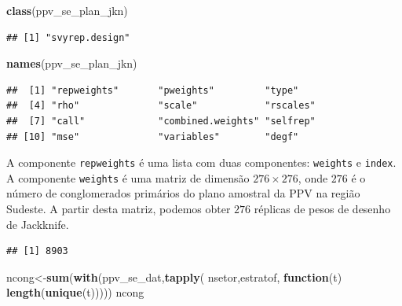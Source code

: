 \documentclass[]{book}
\newenvironment{Shaded}{\begin{snugshade}}{\end{snugshade}}
\newcommand{\KeywordTok}[1]{\textcolor[rgb]{0.13,0.29,0.53}{\textbf{#1}}}
\newcommand{\ControlFlowTok}[1]{\textcolor[rgb]{0.13,0.29,0.53}{\textbf{#1}}}
\newcommand{\OperatorTok}[1]{\textcolor[rgb]{0.81,0.36,0.00}{\textbf{#1}}}
\newcommand{\NormalTok}[1]{#1}
\theoremstyle{definition}
\theoremstyle{definition}
\theoremstyle{definition}
\theoremstyle{remark}
\begin{document}
\begin{Shaded}
\begin{Highlighting}[]
\KeywordTok{class}\NormalTok{(ppv_se_plan_jkn)}
\end{Highlighting}
\end{Shaded}

\begin{verbatim}
## [1] "svyrep.design"
\end{verbatim}

\begin{Shaded}
\begin{Highlighting}[]
\KeywordTok{names}\NormalTok{(ppv_se_plan_jkn)}
\end{Highlighting}
\end{Shaded}

\begin{verbatim}
##  [1] "repweights"       "pweights"         "type"            
##  [4] "rho"              "scale"            "rscales"         
##  [7] "call"             "combined.weights" "selfrep"         
## [10] "mse"              "variables"        "degf"
\end{verbatim}

A componente \texttt{repweights} é uma lista com duas componentes:
\texttt{weights} e \texttt{index}. A componente \texttt{weights} é uma
matriz de dimensão \(276 \times 276\), onde \(276\) é o número de
conglomerados primários do plano amostral da PPV na região Sudeste. A
partir desta matriz, podemos obter \(276\) réplicas de pesos de desenho
de Jackknife.

\begin{Shaded}
\end{Shaded}

\begin{verbatim}
## [1] 8903
\end{verbatim}

\begin{Shaded}
\begin{Highlighting}[]
\NormalTok{ncong<-}\KeywordTok{sum}\NormalTok{(}\KeywordTok{with}\NormalTok{(ppv_se_dat,}\KeywordTok{tapply}\NormalTok{( nsetor,estratof, }\ControlFlowTok{function}\NormalTok{(t) }\KeywordTok{length}\NormalTok{(}\KeywordTok{unique}\NormalTok{(t)))))}
\NormalTok{ncong}
\end{Highlighting}
\end{Shaded}
\end{document}
